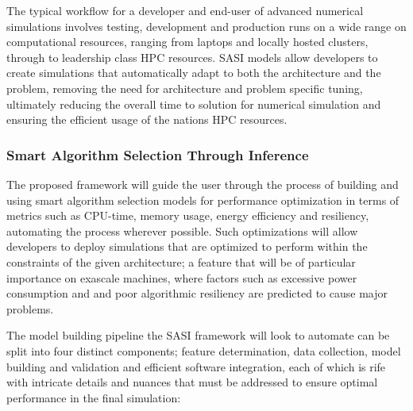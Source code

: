 The typical workflow for a developer and end-user of advanced numerical simulations involves testing, development and production runs on a wide range on computational resources, ranging from laptops and locally hosted clusters, through to leadership class HPC resources. SASI models allow developers to create simulations that automatically adapt to both the architecture and the problem, removing the need for architecture and problem specific tuning, ultimately reducing the overall time to solution for numerical simulation and ensuring the efficient usage of the nations HPC resources.  

\subsubsection{Smart Algorithm Selection Through Inference }

The proposed framework will guide the user through the process of building and using smart algorithm selection models for performance optimization in terms of metrics such as CPU-time, memory usage, energy efficiency and resiliency, automating the process wherever possible. Such optimizations will allow developers to deploy simulations that are optimized to perform within the constraints of the given architecture; a feature that will be of particular importance on exascale machines, where factors such as excessive power consumption and and poor algorithmic resiliency are predicted to cause major problems.

The model building pipeline the SASI framework will look to automate can be split into four distinct components; feature determination, data collection, model building and validation and efficient software integration, each of which is rife with intricate details and nuances that must be addressed to ensure optimal performance in the final simulation:

